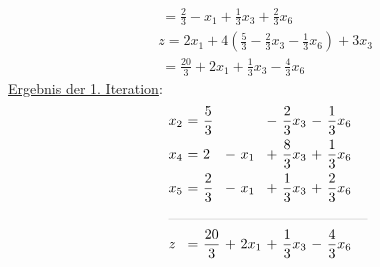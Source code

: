 \documentclass [a4paper,11pt]{article}
\begin{document}
\begin{enumerate}
\begin{enumerate}
\begin{align*}
                    &    \ = \frac{2}{3} - x_1 + \frac{1}{3} x_3 + \frac{2}{3} x_6\\
                    &   z  = 2x_1 + 4\left( \frac{5}{3} - \frac{2}{3} x_3 -\frac{1}{3} x_6 \right) + 3x_3\\
                    &    \ = \frac{20}{3} + 2x_1 + \frac{1}{3} x_3 - \frac{4}{3} x_6
                \end{align*}
                \underline{Ergebnis der 1. Iteration}:
                \begin{align*}
                \begin{alignedat}{6}
                & x_2 &\ = &\ \frac{5}{3}  &    &       &\ - &\ \frac{2}{3}x_3 &\ - &\ \frac{1}{3}x_6 \\
                & x_4 &\ = &\ 2            &\ - &\  x_1 &\ + &\ \frac{8}{3}x_3 &\ + &\ \frac{1}{3}x_6 \\
                & x_5 &\ = &\ \frac{2}{3}  &\ - &\  x_1 &\ + &\ \frac{1}{3}x_3 &\ + &\ \frac{2}{3}x_6 \\
                &\rlap{\rule{5cm}{.1pt}} &&&&&&&&\\
                & z   &\ = &\ \frac{20}{3} &\ + &\ 2x_1 &\ + &\ \frac{1}{3}x_3 &\ - &\ \frac{4}{3}x_6
                \end{alignedat}
                \end{align*}


\end{enumerate}
\end{enumerate}
\end{document}
